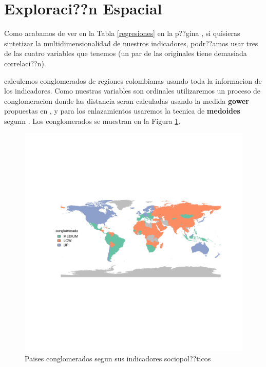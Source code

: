 \documentclass{article}
\begin{document}
\clearpage

\section{Exploraci??n Espacial}

Como acabamos de ver en la Tabla \ref{regresiones} en la p??gina \pageref{regresiones}, si quisieras sintetizar la multidimensionalidad de nuestros indicadores, podr??amos usar tres de las cuatro variables que tenemos (un par de las originales tiene demasiada correlaci??n). 

 calculemos conglomerados de regiones colombianas usando toda la informacion de los indicadores. Como nuestras variables son ordinales utilizaremos un proceso de conglomeracion donde las distancia seran calculadas usando la medida {\bf gower} propuestas en \cite{gower_general_1971}, y para los enlazamientos usaremos la tecnica de {\bf medoides} segunn \cite{reynolds_clustering_2006}. Los  conglomerados se muestran en la Figura \ref{clustmap}.






\begin{figure}[h]
\centering
\begin{adjustbox}{width=11cm,height=8cm,clip,trim=1cm 2.5cm 0cm 2.5cm}
\includegraphics{paperVersion_6-plotMap1}

\end{adjustbox}
\caption{Paises conglomerados segun sus indicadores sociopol??ticos}\label{clustmap}
\end{figure}


\renewcommand{\refname}{Bibliografia}

\end{document}
